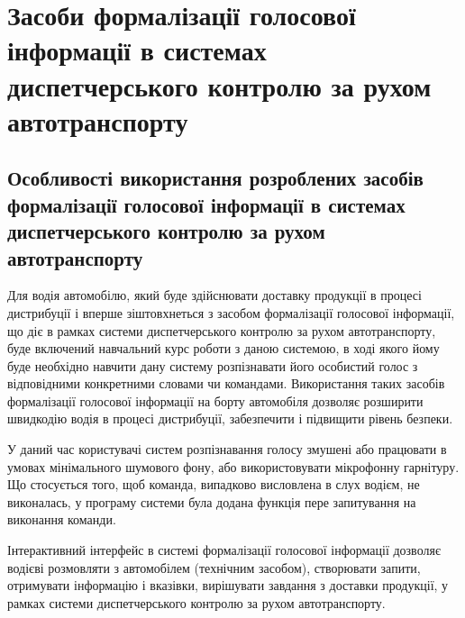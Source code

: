 \chapter{Засоби формалізації голосової інформації в системах диспетчерського контролю за рухом автотранспорту} \label{chapt4}

\section{Особливості використання розроблених засобів формалізації голосової інформації в системах диспетчерського контролю за рухом автотранспорту} \label{sect4_1}

Для водія автомобілю, який буде здійснювати доставку продукції в процесі дистрибуції і вперше зіштовхнеться з засобом формалізації голосової інформації, що діє в рамках системи диспетчерського контролю за рухом автотранспорту, буде включений навчальний курс роботи з даною системою, в ході якого йому буде необхідно навчити дану систему розпізнавати його особистий голос з відповідними конкретними словами чи командами. Використання таких засобів формалізації голосової інформації на борту автомобіля дозволяє розширити швидкодію водія в процесі дистрибуції, забезпечити і підвищити рівень безпеки.

У даний час користувачі систем розпізнавання голосу змушені або працювати в умовах мінімального шумового фону, або використовувати мікрофонну гарнітуру. Що стосується того, щоб команда, випадково висловлена в слух водієм, не виконалась, у програму системи була додана функція пере запитування на виконання команди.

Інтерактивний інтерфейс в системі формалізації голосової інформації дозволяє водієві розмовляти з автомобілем (технічним засобом), створювати запити, отримувати інформацію і вказівки, вирішувати завдання з доставки продукції, у рамках системи диспетчерського контролю за рухом автотранспорту.

